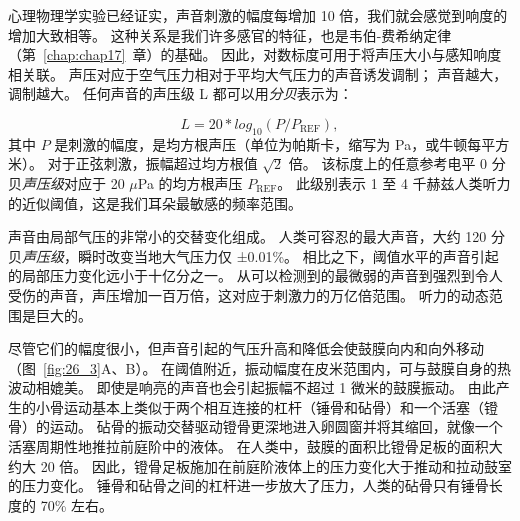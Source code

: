 心理物理学实验已经证实，声音刺激的幅度每增加 10 倍，我们就会感觉到响度的增加大致相等。
这种关系是我们许多感官的特征，也是韦伯-费希纳定律（第~\ref{chap:chap17}~章）的基础。
因此，对数标度可用于将声压大小与感知响度相关联。 
声压对应于空气压力相对于平均大气压力的声音诱发调制；
声音越大，调制越大。
任何声音的声压级 L 都可以用\textit{分贝}表示为：

\begin{equation}\label{sound_pressure}
	L = 20 * log_{10} (P/P_{\text{REF}}),
\end{equation}
%
其中 $P$ 是刺激的幅度，是均方根声压（单位为帕斯卡，缩写为 Pa，或牛顿每平方米）。 
对于正弦刺激，振幅超过均方根值 $ \sqrt{2}$ 倍。 
该标度上的任意参考电平 0 分贝\textit{声压级}对应于 20 $\mu$Pa 的均方根声压 $P_{\text{REF}}$。
此级别表示 1 至 4 千赫兹人类听力的近似阈值，这是我们耳朵最敏感的频率范围。


声音由局部气压的非常小的交替变化组成。
人类可容忍的最大声音，大约 120 分贝\textit{声压级}，瞬时改变当地大气压力仅 ±0.01\%。
相比之下，阈值水平的声音引起的局部压力变化远小于十亿分之一。
从可以检测到的最微弱的声音到强烈到令人受伤的声音，声压增加一百万倍，这对应于刺激力的万亿倍范围。
听力的动态范围是巨大的。


尽管它们的幅度很小，但声音引起的气压升高和降低会使鼓膜向内和向外移动（图~\ref{fig:26_3}A、B）。
在阈值附近，振动幅度在皮米范围内，可与鼓膜自身的热波动相媲美。
即使是响亮的声音也会引起振幅不超过 1 微米的鼓膜振动。
由此产生的小骨运动基本上类似于两个相互连接的杠杆（锤骨和砧骨）和一个活塞（镫骨）的运动。
砧骨的振动交替驱动镫骨更深地进入卵圆窗并将其缩回，就像一个活塞周期性地推拉前庭阶中的液体。
在人类中，鼓膜的面积比镫骨足板的面积大约大 20 倍。
因此，镫骨足板施加在前庭阶液体上的压力变化大于推动和拉动鼓室的压力变化。
锤骨和砧骨之间的杠杆进一步放大了压力，人类的砧骨只有锤骨长度的 70\% 左右。


